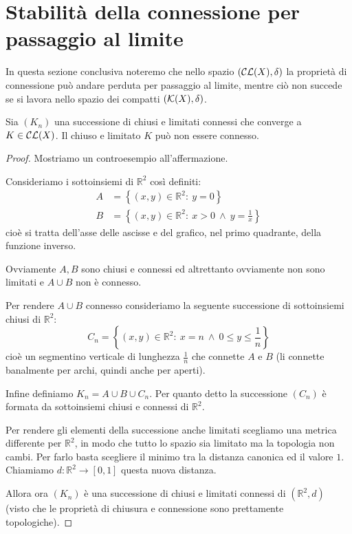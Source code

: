 \section{Stabilità della connessione per passaggio al limite}
In questa sezione conclusiva noteremo che nello spazio $(\mathcal{CL}(X),\delta)$ la proprietà di connessione può andare perduta per passaggio al limite, mentre ciò non succede se si lavora nello spazio dei compatti $(\mathcal{K}(X),\delta)$.

\begin{theorem}
	Sia $(K_n)$ una successione di chiusi e limitati connessi che converge a $K\in\mathcal{CL}(X)$. Il chiuso e limitato $K$ può non essere connesso.
\end{theorem}
\begin{proof}
	Mostriamo un controesempio all'affermazione.
	
	Consideriamo i sottoinsiemi di $\mathbb R^2$ così definiti:
	\begin{align*}
		A&=\left\{(x,y)\in\mathbb R^2:\ y=0\right\}\\
		B&=\left\{(x,y)\in\mathbb R^2:\ x> 0\ \wedge\ y=\frac 1x \right\}
	\end{align*}
	cioè si tratta dell'asse delle ascisse e del grafico, nel primo quadrante, della funzione inverso.
	
	Ovviamente $A,B$ sono chiusi e connessi ed altrettanto ovviamente non sono limitati e $A\cup B$ non è connesso.
	
	Per rendere $A\cup B$ connesso consideriamo la seguente successione di sottoinsiemi chiusi di $\mathbb R^2$:
	\begin{equation}
		C_n=\left\{(x,y)\in\mathbb R^2:\ x=n\ \wedge\ 0\le y\le \frac 1n\right\}
	\end{equation}
	cioè un segmentino verticale di lunghezza $\frac 1n$ che connette $A$ e $B$ (li connette banalmente per archi, quindi anche per aperti).
	
	Infine definiamo $K_n=A\cup B\cup C_n$. Per quanto detto la successione $(C_n)$ è formata da sottoinsiemi chiusi e connessi di $\mathbb R^2$.
	
	Per rendere gli elementi della successione anche limitati scegliamo una metrica differente per $\mathbb R^2$, in modo che tutto lo spazio sia limitato ma la topologia non cambi. Per farlo basta scegliere il minimo tra la distanza canonica ed il valore $1$. Chiamiamo $d:\mathbb R^2\to [0,1]$ questa nuova distanza.
	
	Allora ora $(K_n)$ è una successione di chiusi e limitati connessi di $(\mathbb R^2, d)$ (visto che le proprietà di chiusura e connessione sono prettamente topologiche).
	

\end{proof}
